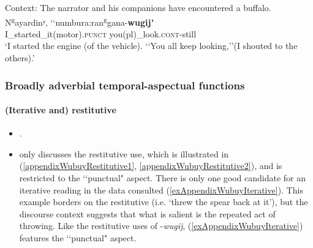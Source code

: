\begin{exe}
	\ex \label{exAppendixWubuyKeep}
	Context: The narrator and his companions have encountered a buffalo.\\
	\gll N\textsuperscript{g}ayardinʸ, \lq\lq numbura:ran\textsuperscript{g}gana-\textbf{wugij}"\\
	I\_started\_it(motor).\textsc{punct} \phantom{\lq\lq}you(pl)\_look.\textsc{cont}-still\\
	\glt \lq I started the engine (of the vehicle). \lq\lq You all keep looking,\rq\rq (I shouted to the others).' \parencite[512]{Heath1980}	
\end{exe}

\subsubsection{Broadly adverbial temporal-aspectual functions}
\paragraph{(Iterative and) restitutive}
\label{appendixWubuyIterative}
\begin{itemize}
	\item \textcite[447–448]{Heath1984}.
	\item \textcite{Heath1984} only discusses the restitutive use, which is illustrated in (\ref{appendixWubuyRestitutive1}, \ref{appendixWubuyRestitutive2}), and is restricted to the \lq\lq punctual" aspect. There is only one good candidate for an iterative reading in the data consulted (\ref{exAppendixWubuyIterative}). This example borders on the restitutive (i.e. \lq threw the spear back at it'), but the discourse context suggests that what is salient is the repeated act of throwing. Like the restitutive uses of -\textit{wugij}, (\ref{exAppendixWubuyIterative}) features the \lq\lq punctual" aspect.
\end{itemize}	
